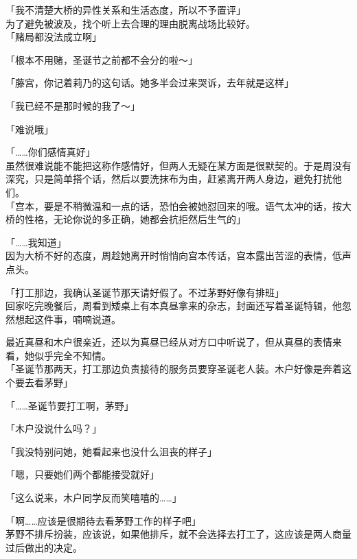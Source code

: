 「我不清楚大桥的异性关系和生活态度，所以不予置评」\\

为了避免被波及，找个听上去合理的理由脱离战场比较好。\\

「赌局都没法成立啊」

「根本不用赌，圣诞节之前都不会分的啦～」

「藤宫，你记着莉乃的这句话。她多半会过来哭诉，去年就是这样」

「我已经不是那时候的我了～」

「难说哦」

「……你们感情真好」\\

虽然很难说能不能把这称作感情好，但两人无疑在某方面是很默契的。于是周没有深究，只是简单搭个话，然后以要洗抹布为由，赶紧离开两人身边，避免打扰他们。\\

「宫本，要是不稍微温和一点的话，恐怕会被她怼回来的哦。语气太冲的话，按大桥的性格，无论你说的多正确，她都会抗拒然后生气的」

「……我知道」\\

因为大桥不好的态度，周趁她离开时悄悄向宫本传话，宫本露出苦涩的表情，低声点头。\\

\vspace{2\baselineskip}

「打工那边，我确认圣诞节那天请好假了。不过茅野好像有排班」\\

回家吃完晚餐后，周看到矮桌上有本真昼拿来的杂志，封面还写着圣诞特辑，他忽然想起这件事，喃喃说道。

最近真昼和木户很亲近，还以为真昼已经从对方口中听说了，但从真昼的表情来看，她似乎完全不知情。\\

「圣诞节那两天，打工那边负责接待的服务员要穿圣诞老人装。木户好像是奔着这个要去看茅野」

「……圣诞节要打工啊，茅野」

「木户没说什么吗？」

「我没特别问她，她看起来也没什么沮丧的样子」

「嗯，只要她们两个都能接受就好」

「这么说来，木户同学反而笑嘻嘻的……」

「啊……应该是很期待去看茅野工作的样子吧」\\

茅野不排斥扮装，应该说，如果他排斥，就不会选择去打工了，这应该是两人商量过后做出的决定。

